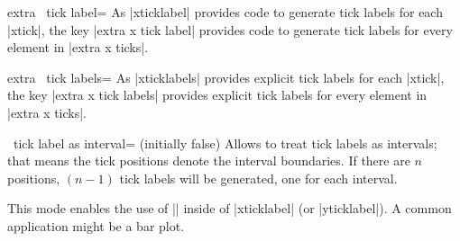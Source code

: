 \begin{pgfplotsxykey}{extra \x\ tick label=}
	As |xticklabel| provides code to generate tick labels for each |xtick|, the key |extra x tick label| provides code to generate tick labels for every element in |extra x ticks|.
\end{pgfplotsxykey}

\begin{pgfplotsxykey}{extra \x\ tick labels=}
	As |xticklabels| provides explicit tick labels for each |xtick|, the key |extra x tick labels| provides explicit tick labels for every element in |extra x ticks|.
\end{pgfplotsxykey}



\begin{pgfplotsxykey}{\x\ tick label as interval= (initially false)}
\label{key:pgfplots:ticklabelasinterval}
	Allows to treat tick labels as intervals; that means the tick positions denote the interval boundaries. If there are $n$ positions, $(n-1)$ tick labels will be generated, one for each interval.
\begin{codeexample}[]
\end{codeexample}
	This mode enables the use of |\nexttick| inside of |xticklabel| (or |yticklabel|). A common application might be a bar plot.
\begin{codeexample}[]
\end{codeexample}
\end{pgfplotsxykey}



